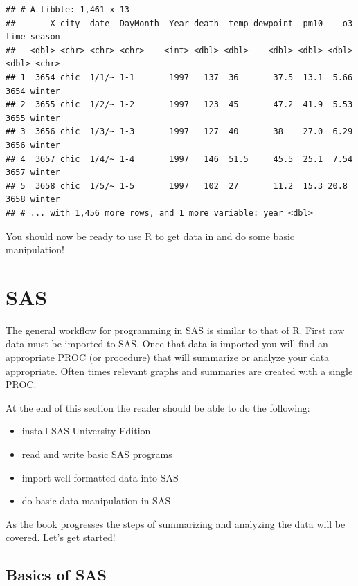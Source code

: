\documentclass[
]{book}
\providecommand{\tightlist}{%
  \setlength{\itemsep}{0pt}\setlength{\parskip}{0pt}}
\theoremstyle{definition}
\theoremstyle{definition}
\theoremstyle{definition}
\theoremstyle{remark}
\begin{document}
\begin{verbatim}
## # A tibble: 1,461 x 13
##       X city  date  DayMonth  Year death  temp dewpoint  pm10    o3  time season
##   <dbl> <chr> <chr> <chr>    <int> <dbl> <dbl>    <dbl> <dbl> <dbl> <dbl> <chr> 
## 1  3654 chic  1/1/~ 1-1       1997   137  36       37.5  13.1  5.66  3654 winter
## 2  3655 chic  1/2/~ 1-2       1997   123  45       47.2  41.9  5.53  3655 winter
## 3  3656 chic  1/3/~ 1-3       1997   127  40       38    27.0  6.29  3656 winter
## 4  3657 chic  1/4/~ 1-4       1997   146  51.5     45.5  25.1  7.54  3657 winter
## 5  3658 chic  1/5/~ 1-5       1997   102  27       11.2  15.3 20.8   3658 winter
## # ... with 1,456 more rows, and 1 more variable: year <dbl>
\end{verbatim}

You should now be ready to use R to get data in and do some basic manipulation!

\hypertarget{sas}{%
\section{SAS}\label{sas}}

The general workflow for programming in SAS is similar to that of R. First raw data must be imported to SAS. Once that data is imported you will find an appropriate PROC (or procedure) that will summarize or analyze your data appropriate. Often times relevant graphs and summaries are created with a single PROC.

At the end of this section the reader should be able to do the following:

\begin{itemize}
\tightlist
\item
  install SAS University Edition\\
\item
  read and write basic SAS programs\\
\item
  import well-formatted data into SAS
\item
  do basic data manipulation in SAS
\end{itemize}

As the book progresses the steps of summarizing and analyzing the data will be covered. Let's get started!

\hypertarget{basics-of-sas}{%
\subsection{Basics of SAS}\label{basics-of-sas}}
\end{document}
